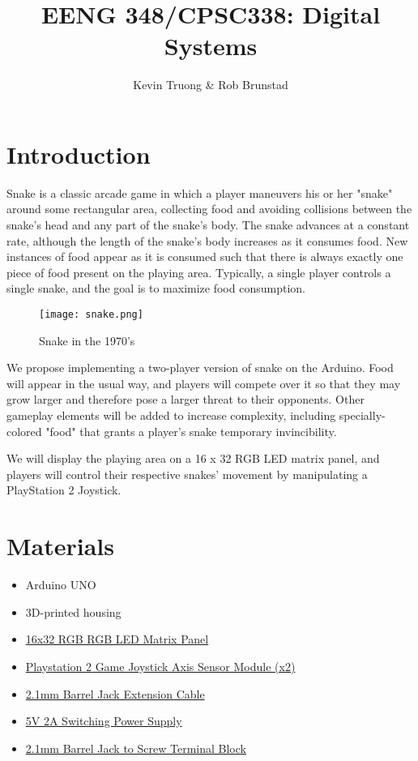 \documentclass[12pt]{article}
\begin{document}
\title{EENG 348/CPSC\textsc{338}: Digital Systems}
\author{Kevin Truong \& Rob Brunstad} 
\maketitle
\section{Introduction}
    Snake is a classic arcade game in which a player maneuvers his or her "snake" around some rectangular area, collecting food and avoiding collisions between the snake's head and any part of the snake's body. The snake advances at a constant rate, although the length of the snake's body increases as it consumes food. New instances of food appear as it is consumed such that there is always exactly one piece of food present on the playing area. Typically, a single player controls a single snake, and the goal is to maximize food consumption.
       \begin{figure}[h!]
        \centering
        \texttt{[image: snake.png]}
        \caption{Snake in the 1970's}\label{button}
    \end{figure}
We propose implementing a two-player version of snake on the Arduino. Food will appear in the usual way, and players will compete over it so that they may grow larger and therefore pose a larger threat to their opponents. Other gameplay elements will be added to increase complexity, including specially-colored "food" that grants a player's snake temporary invincibility.

We will display the playing area on a 16 x 32 RGB LED matrix panel, and players will control their respective snakes' movement by manipulating a PlayStation 2 Joystick.

\section{Materials}
\begin{itemize}
    \item Arduino UNO
    \item 3D-printed housing
    \item \href{https://www.adafruit.com/product/420}{16x32 RGB RGB LED Matrix Panel}
    \item \href{https://www.newegg.com/Product/Product.aspx?Item=9SIABKS5R53998i&ignorebbr=1&nm_mc=KNC-GoogleMKP-PC&cm_mmc=KNC-GoogleMKP-PC-_-pla-_-Gadgets-_-9SIABKS5R53998&gclid=EAIaIQobChMIrq-a7qKL2gIVG0sNCh11XASxEAkYAiABEgKUXPD_BwE&gclsrc=aw.ds}{Playstation 2 Game Joystick Axis Sensor Module (x2)}
    
    \item \href{https://www.adafruit.com/product/327}{2.1mm Barrel Jack Extension Cable}
    \item \href{https://www.adafruit.com/product/276}{5V 2A Switching Power Supply}
    \item \href{https://www.adafruit.com/product/368}{2.1mm Barrel Jack to Screw Terminal Block}
\end{itemize}
\end{document}
